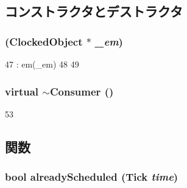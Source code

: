 \subsection{コンストラクタとデストラクタ}
\hypertarget{classConsumer_a645ceafe42017acfa86025960f300df1}{
\subsubsection[{Consumer}]{ ({\bf ClockedObject} $\ast$ {\em \_\-em})}}
\label{classConsumer_a645ceafe42017acfa86025960f300df1}



\begin{DoxyCode}
47         : em(_em)
48     {
49     }
\end{DoxyCode}
\hypertarget{classConsumer_afc5a9aad1f27ac3414bc75d841e848ee}{
\subsubsection[{$\sim$Consumer}]{\setlength{\rightskip}{0pt plus 5cm}virtual $\sim${\bf Consumer} ()}}
\label{classConsumer_afc5a9aad1f27ac3414bc75d841e848ee}



\begin{DoxyCode}
53     { }
\end{DoxyCode}


\subsection{関数}
\hypertarget{classConsumer_a995ed0e67a3f05938c1cb5c8152ac5af}{
\subsubsection[{alreadyScheduled}]{\setlength{\rightskip}{0pt plus 5cm}bool alreadyScheduled ({\bf Tick} {\em time})}}
\label{classConsumer_a995ed0e67a3f05938c1cb5c8152ac5af}



